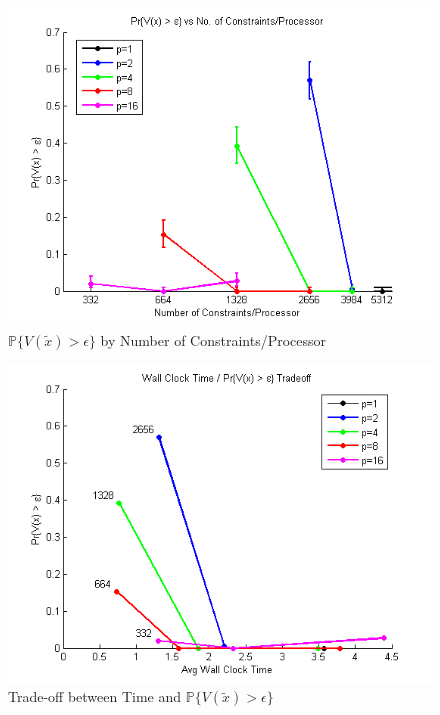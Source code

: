 \documentclass[12pt]{article}
\begin{document}
\begin{figure}[ht]
	\centering
		\includegraphics{../plot/figs/probviolprobgreateps_numconstraint.png}
	\caption{$\mathbb{P}\{V(\tilde{x}) > \epsilon \}$ by Number of Constraints/Processor}
	\label{fig:probviolprobgreateps_numconstraint}
\end{figure}

\begin{figure}[ht]
	\centering
		\includegraphics{../plot/figs/wct_probviolprobgreateps_frontier_constraint.png}
	\caption{Trade-off between Time and $\mathbb{P}\{V(\tilde{x}) > \epsilon \}$}
	\label{fig:wct_probviolprobgreateps_frontier_constraint}
\end{figure}
\end{document}
